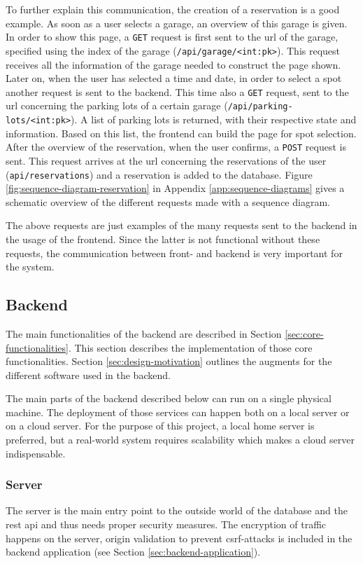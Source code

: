 \ind To further explain this communication, the creation of a reservation is a good example. As soon as a user selects a garage, an overview of this garage is given. In order to show this page, a \verb|GET| request is first sent to the \ac{url} of the garage, specified using the index of the garage (\verb|/api/garage/<int:pk>|). This request receives all the information of the garage needed to construct the page shown. Later on, when the user has selected a time and date, in order to select a spot another request is sent to the backend. This time also a \verb|GET| request, sent to the \ac{url} concerning the parking lots of a certain garage (\verb|/api/parking-lots/<int:pk>|). A list of parking lots is returned, with their respective state and information. Based on this list, the frontend can build the page for spot selection. After the overview of the reservation, when the user confirms, a \verb|POST| request is sent. This request arrives at the \ac{url} concerning the reservations of the user (\verb|api/reservations|) and a reservation is added to the database. Figure \ref{fig:sequence-diagram-reservation} in Appendix \ref{app:sequence-diagrams} gives a schematic overview of the different requests made with a sequence diagram.

\ind The above requests are just examples of the many requests sent to the backend in the usage of the frontend. Since the latter is not functional without these requests, the communication between front- and backend is very important for the system.

\subsection{Backend}\label{sec:implementation-backend}
The main functionalities of the backend are described in Section \ref{sec:core-functionalities}. This section describes the implementation of those core functionalities. Section \ref{sec:design-motivation} outlines the augments for the different software used in the backend.

\ind The main parts of the backend described below can run on a single physical machine. The deployment of those services can happen both on a local server or on a cloud server. For the purpose of this project, a local home server is preferred, but a real-world system requires scalability which makes a cloud server indispensable.

\subsubsection{Server}
The server is the main entry point to the outside world of the database and the \ac{rest} \ac{api} and thus needs proper security measures. The encryption of traffic happens on the server, origin validation to prevent \ac{csrf}-attacks is included in the backend application (see Section \ref{sec:backend-application}). 

